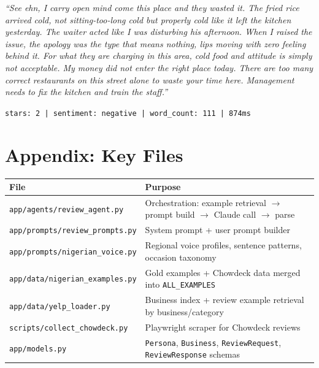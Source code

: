 \documentclass[11pt]{article}
\begin{document}
\smallskip
{\small\itshape ``See ehn, I carry open mind come this place and they wasted it. The fried rice arrived cold, not sitting-too-long cold but properly cold like it left the kitchen yesterday. The waiter acted like I was disturbing his afternoon. When I raised the issue, the apology was the type that means nothing, lips moving with zero feeling behind it. For what they are charging in this area, cold food and attitude is simply not acceptable. My money did not enter the right place today. There are too many correct restaurants on this street alone to waste your time here. Management needs to fix the kitchen and train the staff.''}

\smallskip\noindent\texttt{stars: 2 | sentiment: negative | word\_count: 111 | 874ms}


\section*{Appendix: Key Files}

\begin{table}[h]
\centering
\begin{tabularx}{\textwidth}{lX}
\toprule
\textbf{File} & \textbf{Purpose} \\
\midrule
\texttt{app/agents/review\_agent.py} & Orchestration: example retrieval $\rightarrow$ prompt build $\rightarrow$ Claude call $\rightarrow$ parse \\
\texttt{app/prompts/review\_prompts.py} & System prompt + user prompt builder \\
\texttt{app/prompts/nigerian\_voice.py} & Regional voice profiles, sentence patterns, occasion taxonomy \\
\texttt{app/data/nigerian\_examples.py} & Gold examples + Chowdeck data merged into \texttt{ALL\_EXAMPLES} \\
\texttt{app/data/yelp\_loader.py} & Business index + review example retrieval by business/category \\
\texttt{scripts/collect\_chowdeck.py} & Playwright scraper for Chowdeck reviews \\
\texttt{app/models.py} & \texttt{Persona}, \texttt{Business}, \texttt{ReviewRequest}, \texttt{ReviewResponse} schemas \\
\bottomrule
\end{tabularx}
\end{table}
\end{document}
